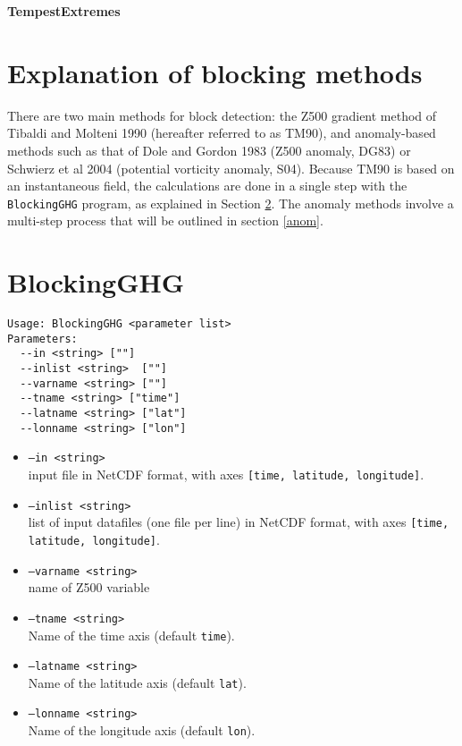 \documentclass{article}
\begin{document}
{\Huge \textbf{TempestExtremes}}


\section{Explanation of blocking methods}

There are two main methods for block detection: the Z500 gradient method of Tibaldi and Molteni 1990 (hereafter referred to as TM90), and anomaly-based methods such as that of Dole and Gordon 1983 (Z500 anomaly, DG83) or Schwierz et al 2004 (potential vorticity anomaly, S04). Because TM90 is based on an instantaneous field, the calculations are done in a single step with the \texttt{BlockingGHG} program, as explained in Section \ref{ghg}. The anomaly methods involve a multi-step process that will be outlined in section \ref{anom}.

\section{BlockingGHG}\label{ghg}

\begin{verbatim}
Usage: BlockingGHG <parameter list>
Parameters:
  --in <string> [""]
  --inlist <string>  [""]
  --varname <string> [""]
  --tname <string> ["time"]
  --latname <string> ["lat"]
  --lonname <string> ["lon"]
\end{verbatim}

\begin{itemize}
\item[]\texttt{--in <string>} \\ input file in NetCDF format, with axes \texttt{[time, latitude, longitude]}. 
\item[]\texttt{--inlist <string>}\\ list of input datafiles (one file per line) in NetCDF format, with axes \texttt{[time, latitude, longitude]}. 
\item[] \texttt{--varname <string>}\\ name of Z500 variable
\item[] \texttt{--tname <string>}\\Name of the time axis (default \texttt{time}).
\item[]\texttt{--latname <string>}\\Name of the latitude axis (default \texttt{lat}).
\item[]\texttt{--lonname <string>}\\Name of the longitude axis (default \texttt{lon}).
\end{itemize}
\end{document}
